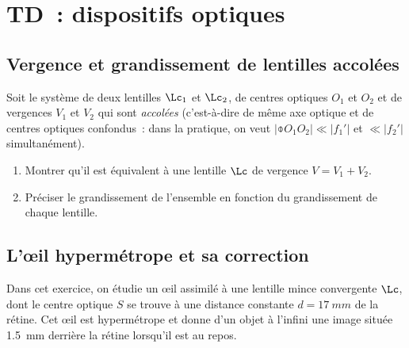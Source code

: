 \documentclass[a4paper, 12pt, final, garamond]{book}
\begin{document}
\setcounter{chapter}{3}

\chapter{TD~: dispositifs optiques}

\section{Vergence et grandissement de lentilles accolées}
Soit le système de deux lentilles $\Lc_1$ et $\Lc_2$, de centres optiques
$O_1$ et $O_2$ et de vergences $V_1$ et $V_2$ qui sont \textit{accolées}
(c'est-à-dire de même axe optique et de centres optiques confondus~: dans la
pratique, on veut $|\obar{O_1O_2}| \ll |f_1'|$ et $\ll |f_2'|$ simultanément).

\begin{enumerate}
    \item Montrer qu'il est équivalent à une lentille $\Lc$ de vergence $V = V_1
        + V_2$.
    \item Préciser le grandissement de l'ensemble en fonction du grandissement
        de chaque lentille.
\end{enumerate}

\section{L'œil hypermétrope et sa correction}

Dans cet exercice, on étudie un œil assimilé à une lentille mince convergente
$\Lc$, dont le centre optique $S$ se trouve à une distance constante $d =
\SI{17}{mm}$ de la rétine. Cet œil est hypermétrope et donne d'un objet à
l'infini une image située \SI{1.5}{mm} derrière la rétine lorsqu'il est au repos.
\end{document}
